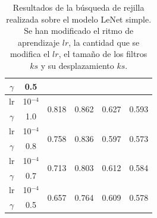 \documentclass[a4paper,12pt,twoside,titlepage]{article}
\begin{document}
\begin{table}[h!]
\begin{tabular}{|cc||cc|cc|cc|cc|}
  \multicolumn{1}{|c|}{$\gamma$} & 0.5       & \multicolumn{2}{c|}{}                       & \multicolumn{2}{c|}{}                       & \multicolumn{2}{c|}{}                       & \multicolumn{2}{c|}{}                       \\ \hline
  \multicolumn{1}{|c|}{lr}       & 10$^{-4}$ & \multicolumn{2}{c|}{\multirow{2}{*}{0.818}} & \multicolumn{2}{c|}{\multirow{2}{*}{0.862}} & \multicolumn{2}{c|}{\multirow{2}{*}{0.627}} & \multicolumn{2}{c|}{\multirow{2}{*}{0.593}} \\ \cline{1-2}
  \multicolumn{1}{|c|}{$\gamma$} & 1.0       & \multicolumn{2}{c|}{}                       & \multicolumn{2}{c|}{}                       & \multicolumn{2}{c|}{}                       & \multicolumn{2}{c|}{}                       \\ \hline
  \multicolumn{1}{|c|}{lr}       & 10$^{-4}$ & \multicolumn{2}{c|}{\multirow{2}{*}{0.758}} & \multicolumn{2}{c|}{\multirow{2}{*}{0.836}} & \multicolumn{2}{c|}{\multirow{2}{*}{0.597}} & \multicolumn{2}{c|}{\multirow{2}{*}{0.573}} \\ \cline{1-2}
  \multicolumn{1}{|c|}{$\gamma$} & 0.8       & \multicolumn{2}{c|}{}                       & \multicolumn{2}{c|}{}                       & \multicolumn{2}{c|}{}                       & \multicolumn{2}{c|}{}                       \\ \hline
  \multicolumn{1}{|c|}{lr}       & 10$^{-4}$ & \multicolumn{2}{c|}{\multirow{2}{*}{0.713}} & \multicolumn{2}{c|}{\multirow{2}{*}{0.803}} & \multicolumn{2}{c|}{\multirow{2}{*}{0.612}} & \multicolumn{2}{c|}{\multirow{2}{*}{0.584}} \\ \cline{1-2}
  \multicolumn{1}{|c|}{$\gamma$} & 0.7       & \multicolumn{2}{c|}{}                       & \multicolumn{2}{c|}{}                       & \multicolumn{2}{c|}{}                       & \multicolumn{2}{c|}{}                       \\ \hline
  \multicolumn{1}{|c|}{lr}       & 10$^{-4}$ & \multicolumn{2}{c|}{\multirow{2}{*}{0.657}} & \multicolumn{2}{c|}{\multirow{2}{*}{0.764}} & \multicolumn{2}{c|}{\multirow{2}{*}{0.609}} & \multicolumn{2}{c|}{\multirow{2}{*}{0.578}} \\ \cline{1-2}
  \multicolumn{1}{|c|}{$\gamma$} & 0.5       & \multicolumn{2}{c|}{}                       & \multicolumn{2}{c|}{}                       & \multicolumn{2}{c|}{}                       & \multicolumn{2}{c|}{}                       \\ \hline
  \end{tabular}
  \caption{Resultados de la búsqueda de rejilla realizada sobre el modelo LeNet simple. Se han modificado el ritmo de aprendizaje $lr$, la cantidad que se modifica el $lr$, el tamaño de los filtros $ks$ y su desplazamiento $ks$.}
  \label{tab:resultados_kernel_simple}
\end{table}
\end{document}
